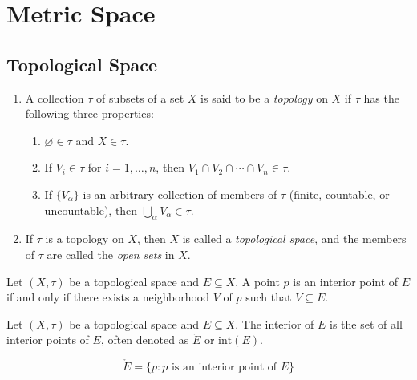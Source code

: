 \section{Metric Space}

\subsection{Topological Space}

\begin{definition}
\leavevmode
\begin{enumerate}
    \item A collection $\tau$ of subsets of a set $X$ is said to be a \emph{topology} on $X$ if $\tau$ has the following three properties:
    \begin{enumerate}
        \item $\varnothing \in \tau$ and $X \in \tau$.
        \item If $V_i \in \tau$ for $i = 1, \dots, n$, then $V_1 \cap V_2 \cap \cdots \cap V_n \in \tau$.
        \item If $\{ V_\alpha \}$ is an arbitrary collection of members of $\tau$ (finite, countable, or uncountable), then $\bigcup_\alpha V_\alpha \in \tau$.
    \end{enumerate}

    \item If $\tau$ is a topology on $X$, then $X$ is called a \emph{topological space}, and the members of $\tau$ are called the \emph{open sets} in $X$.
\end{enumerate}
\end{definition}

\begin{definition}\label{fc673441}
    Let $(X, \tau)$ be a topological space and $E \subseteq X$. A point $p$ is an interior point of $E$ if and only if there exists a neighborhood $V$ of $p$ such that $V \subseteq E$.
\end{definition}


\begin{definition}[Interior]
    Let $(X, \tau)$ be a topological space and $E \subseteq X$. The interior of $E$ is the set of all interior points of $E$, often
    denoted as $\mathring{E}$ or $\mathrm{int}(E)$.

    \[
\mathring{E} = \{ p : p \text{ is an interior point of } E \}
    \]

\end{definition}

